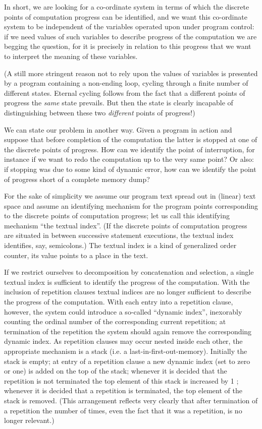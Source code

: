 In short, we are looking for a co-ordinate system in terms of which the discrete points of computation progress can be identified, and we want this co-ordinate system to be independent of the variables operated upon under program control: if we need values of such variables to describe progress of the computation we are begging the question, for it is precisely in relation to this progress that we want to interpret the meaning of these variables.

(A still more stringent reason not to rely upon the values of variables is presented by a program containing a non-ending loop, cycling through a finite number of different states. Eternal cycling follows from the fact that a different points of progress the \textit{same} state prevails. But then the state is clearly incapable of distinguishing between these two \textit{different} points of progress!)

We can state our problem in another way. Given a program in action and suppose that before completion of the computation the latter is stopped at one of the discrete points of progress. How can we identify the point of interruption, for instance if we want to redo the computation up to the very same point? Or also: if stopping was due to some kind of dynamic error, how can we identify the point of progress short of a complete memory dump?

For the sake of simplicity we assume our program text spread out in (linear) text space and assume an identifying mechanism for the program points corresponding to the discrete points of computation progress; let us call this identifying mechanism ``the textual index''. (If the discrete points of computation progress are situated in between successive statement executions, the textual index identifies, say, semicolons.) The textual index is a kind of generalized order counter, its value points to a place in the text.

If we restrict ourselves to decomposition by concatenation and selection, a single textual index is sufficient to identify the progress of the computation. With the inclusion of repetition clauses textual indices are no longer sufficient to describe the progress of the computation. With each entry into a repetition clause, however, the system could introduce a so-called ``dynamic index'', inexorably counting the ordinal number of the corresponding current repetition; at termination of the repetition the system should again remove the corresponding dynamic index. As repetition clauses may occur nested inside each other, the appropriate mechanism is a stack (i.e. a last-in-first-out-memory). Initially the stack is empty; at entry of a repetition clause a new dynamic index (set to zero or one) is added on the top of the stack; whenever it is decided that the repetition is not terminated the top element of this stack is increased by 1 ; whenever it is decided that a repetition is terminated, the top element of the stack is removed. (This arrangement reflects very clearly that after termination of a repetition the number of times, even the fact that it was a repetition, is no longer relevant.)

